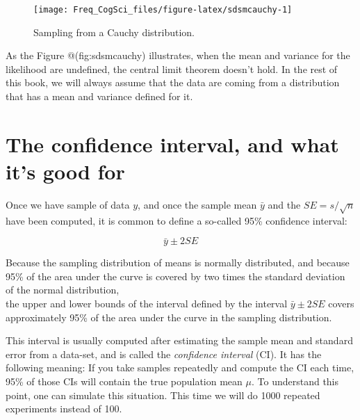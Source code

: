 \documentclass[12pt,]{krantz}
\begin{document}
\begin{figure}
\texttt{[image: Freq\_CogSci\_files/figure-latex/sdsmcauchy-1]} \caption{Sampling from a Cauchy distribution.}\label{fig:sdsmcauchy}
\end{figure}

As the Figure @(fig:sdsmcauchy) illustrates, when the mean and variance for the likelihood are undefined, the central limit theorem doesn't hold. In the rest of this book, we will always assume that the data are coming from a distribution that has a mean and variance defined for it.

\hypertarget{the-confidence-interval-and-what-its-good-for}{%
\section{The confidence interval, and what it's good for}\label{the-confidence-interval-and-what-its-good-for}}

Once we have sample of data \(y\), and once the sample mean \(\bar{y}\) and the \(SE = s/\sqrt{n}\) have been computed, it is common to define a so-called 95\% confidence interval:

\begin{equation}
\bar{y} \pm 2 SE
\end{equation}

Because the sampling distribution of means is normally distributed, and because 95\% of the area under the curve is covered by two times the standard deviation of the normal distribution,\\
the upper and lower bounds of the interval defined by the interval \(\bar{y} \pm 2 SE\) covers approximately 95\% of the area under the curve in the sampling distribution.

This interval is usually computed after estimating the sample mean and standard error from a data-set, and is called the \emph{confidence interval} (CI). It has the following meaning: If you take samples repeatedly and compute the CI each time, 95\% of those CIs will contain the true population mean \(\mu\). To understand this point, one can simulate this situation. This time we will do 1000 repeated experiments instead of 100.
\end{document}
